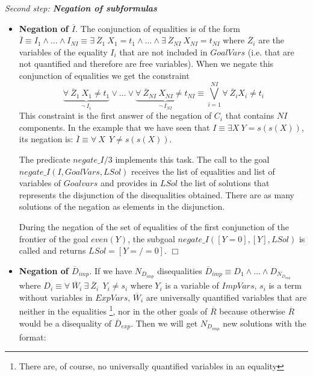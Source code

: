 \documentclass{tlp}
\newcommand{\implementation}[1]{\noindent{\sc Implementation details:}
  #1 $\Box$}
\begin{document}
\medskip

\noindent
{\em Second step: {\bf Negation of subformulas}}

        \begin{itemize}

           \item {\bf Negation of $\overline{I}$}. The conjunction of equalities is of the form $\overline{I}
           \equiv I_1 \wedge \ldots \wedge I_{NI} \equiv \exists~
           \overline{Z}_1~ X_1 = t_1 \wedge \ldots \wedge \exists~
           \overline{Z}_{NI}~ X_{NI} = t_{NI} $ where
           $\overline{Z}_i$ are the variables of the equality $I_i$ that
           are not included in $GoalVars$ (i.e. that are not quantified
           and therefore are free variables). When we negate this
           conjunction of equalities we get the constraint 
                $$
           \underbrace{\forall~ \overline{Z}_1~ X_1 \neq t_1} _{\neg~
           I_1} \vee \ldots \vee \underbrace{\forall~
           \overline{Z}_{NI}~ X_{NI} \neq t_{NI} } _{\neg~ I_{NI}}
           \equiv %
           \bigvee_{i=1}^{NI} \forall~ \overline{Z}_i X_i
           \neq t_i $$ 
           This constraint is the first answer of the negation of $C_i$ that
           contains $NI$ components.  In the example that we have seen that $
           I \equiv \exists X ~ Y=s(s(X))$, its negation is: $\overline{I}
           \equiv \forall~ X~~ Y \neq s(s(X))$.

\implementation{
The predicate $negate\_I/3$ implements this
task. The call to the goal $negate\_I(I,GoalVars,LSol)$ receives the list of
equalities and list of variables of $Goalvars$ and provides in $LSol$ the list
of solutions that represents the disjunction of the disequalities
obtained. There are as many solutions of the negation as elements in the
disjunction.   

During the negation of the set of equalities of the first conjunction of the
frontier of the goal $even(Y)$, the subgoal $negate\_I([Y=0],[Y],LSol)$ is
called and returns $LSol=[Y=/=0]$.
}

           \item {\bf Negation of $\overline{D}_{imp}$}. If we have
           $N_{D_{imp}}$ disequalities $\overline{D}_{imp} \equiv D_1
           \wedge \ldots \wedge D_{N_{D_{imp}}}$ where $ D_i \equiv
           \forall~ \overline{W}_i ~ \exists~ \overline{Z}_i ~~  Y_i
           \neq s_i$ where $Y_i$ is a variable of $ImpVars$, $s_i$ is
           a term without variables in $ExpVars$, $\overline{W}_i$ are
           universally quantified variables that are neither in the
           equalities \footnote{There are, of course, no universally
           quantified variables in an equality}, nor in the other
           goals of $\overline{R}$ because otherwise $\overline{R}$
           would be a disequality of $\overline{D}_{exp}$. Then we
           will get $N_{D_{imp}}$ new solutions with the format: 


\end{itemize}
\end{document}
